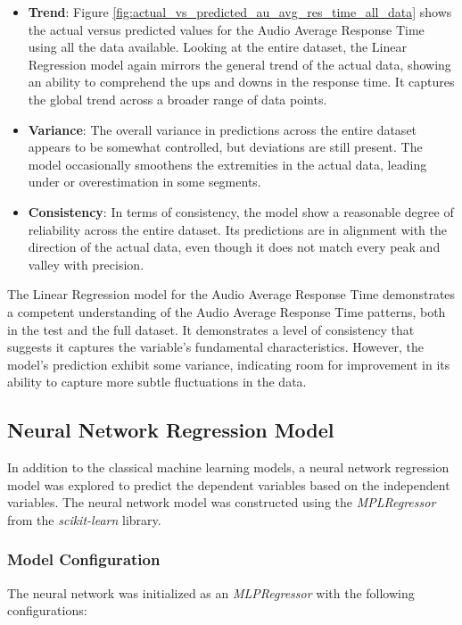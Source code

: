 \begin{itemize}
    \item \textbf{Trend}: Figure \ref{fig:actual_vs_predicted_au_avg_res_time_all_data} shows the actual versus predicted values for the Audio Average Response Time using all the data available. Looking
    at the entire dataset, the Linear Regression model again mirrors the general trend of the actual data, showing an ability to comprehend the ups and downs in the response time. It captures the global trend across a 
    broader range of data points.    
    
    \item \textbf{Variance}: The overall variance in predictions across the entire dataset appears to be somewhat controlled, but deviations are still present. The model occasionally smoothens the extremities 
    in the actual data, leading under or overestimation in some segments.
    
    \item \textbf{Consistency}: In terms of consistency, the model show a reasonable degree of reliability across the entire dataset. Its predictions are in alignment with the direction of the actual data,
    even though it does not match every peak and valley with precision.
    
\end{itemize}


The Linear Regression model for the Audio Average Response Time demonstrates a competent understanding of the Audio Average Response Time patterns, both in the test and the full dataset. It demonstrates 
a level of consistency that suggests it captures the variable's fundamental characteristics. However, the model's prediction exhibit some variance, indicating room for improvement in its ability to capture more
subtle fluctuations in the data.


\subsection{Neural Network Regression Model}

In addition to the classical machine learning models, a neural network regression model was explored to predict the dependent variables based on the independent variables. The neural network model was
constructed using the \textit{MPLRegressor} from the \textit{scikit-learn} library. 

\subsubsection*{Model Configuration} The neural network was initialized as an \textit{MLPRegressor} with the following configurations:

